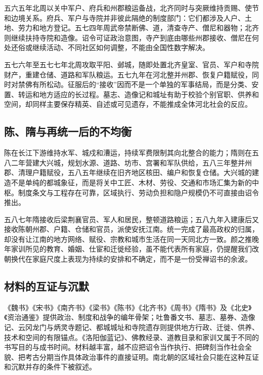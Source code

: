 五六五年北周以关中军户、府兵和州郡粮运备战，北齐同时与突厥维持贡赐、使节和边境关系。府兵、军户与寺院并非彼此隔绝的制度部门：它们都涉及人户、土地、劳力和地方登记。五七四年周武帝禁断佛、道，清查寺产、僧尼和器物；北齐则继续扶持寺院和造像。诏令可证政治意图，寺产到底由哪些州郡接收、僧尼在何处还俗或继续活动、不同社区如何调整，不能由全国性数字解决。

五七六年至五七七年北周攻取平阳、邺城，随即处置北齐皇室、官员、军户和寺院财产，重建仓储、道路和军队粮运。五七九年在河北整并州郡、恢复户籍赋役，同时对禁佛有所松动。征服后的“接收”因而不是一个单独的军事结局，而是分类、安置、转运和地方适应的长过程。墓志、造像记和城址有助于校验个别官职、供养和空间，却同样主要保存精英、自述或可见遗存，不能推成全体河北社会的反应。

\subsection{陈、隋与再统一后的不均衡}

陈在长江下游维持水军、城戍和漕运，持续军费限制其向北整合的能力；隋则在五八二年营建大兴城，规划水源、道路、坊市、宫署和军队供给，五八三年整并州郡、清理户籍赋役，五八五年继续在旧齐地区核田、编户和恢复仓储。大兴城的建造不是单纯的都城象征，而是将关中工匠、木材、劳役、交通和市场汇集为新的中枢。制度条文与工程存在可靠，区域执行、劳动负担和隐户规模仍不可直接由诏令推出。

五八七年隋接收后梁荆襄官员、军人和居民，整顿道路粮运；五八九年入建康后又接收陈朝州郡、户籍、仓储和官员，派使安抚江南。统一完成了最高政权的归属，却没有让江南的地方网络、赋役、宗教和城市生活在同一天同北方一致。颜之推晚年家训所见的教育、婚姻、仕宦和迁徙经验，虽不能代表所有家庭，仍提醒我们改朝换代在家庭尺度上表现为持续的安排和不确定，而不是一份受禅诏书的余波。

\subsection{材料的互证与沉默}

《魏书》《宋书》《南齐书》《梁书》《陈书》《北齐书》《周书》《隋书》及《北史》《资治通鉴》提供政治、制度和战争的编年骨架；吐鲁番文书、墓志、墓券、造像记、云冈龙门与炳灵寺题记、都城城址和寺院遗存则提供地方行政、迁徙、供养、技术和空间的有限锚点。《洛阳伽蓝记》、佛教经录、道教目录和家训又属于不同的书写目的与成书时间。材料越丰富，越不应把诏令当作执行、把碑刻当作社会全貌、把考古分期当作具体政治事件的直接证明。南北朝的区域社会只能在这种互证和沉默并存的条件下被叙述。
